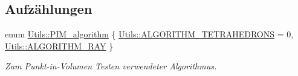 \subsection*{Aufzählungen}
\begin{DoxyCompactItemize}
\item 
enum \hyperlink{namespaceUtils_ad369b0127cabda0d6871ce1ae7e6c862}{Utils\-::\-P\-I\-M\-\_\-algorithm} \{ \hyperlink{namespaceUtils_ad369b0127cabda0d6871ce1ae7e6c862a68e0a4da7ea369e1ba873c380926f010}{Utils\-::\-A\-L\-G\-O\-R\-I\-T\-H\-M\-\_\-\-T\-E\-T\-R\-A\-H\-E\-D\-R\-O\-N\-S} = 0, 
\hyperlink{namespaceUtils_ad369b0127cabda0d6871ce1ae7e6c862a4606bd560af1a6fd19e854e13613e9d0}{Utils\-::\-A\-L\-G\-O\-R\-I\-T\-H\-M\-\_\-\-R\-A\-Y}
 \}
\begin{DoxyCompactList}\small\item\em Zum Punkt-\/in-\/\-Volumen Testen verwendeter Algorithmus. \end{DoxyCompactList}\end{DoxyCompactItemize}
